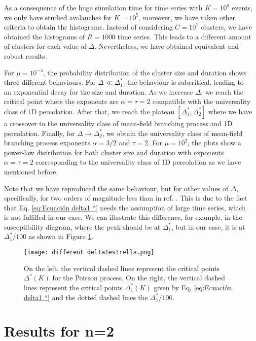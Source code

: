 As a consequence of the huge simulation time for time series with $K=10^8$ events, we only have studied avalanches for $K=10^5$, moreover, we have taken other criteria to obtain the 
histograms. Instead of considering $C=10^7$ clusters, we have obtained the histograms of $R=1000$ time series. This leads to a different amount of clusters for each value of $\Delta$.
Nevertheless, we have obtained equivalent and robust results.

For $\mu=10^{-4}$, the probability distribution of the cluster size and duration shows three different behaviours. For $\Delta\ll\Delta_1^*$, the behaviour is subcritical, leading to
an exponential decay for the size and duration. As we increase $\Delta$, we reach the critical point where the exponents are $\alpha=\tau=2$ compatible with the universality class
of 1D percolation. After that, we reach the plateau $[\Delta_1^*,\Delta_2^*]$ where we have a crossover to the universality class of mean-field branching process and 1D percolation. 
Finally, for $\Delta\to\Delta_2^*$, we obtain the universality class of mean-field branching process exponents $\alpha=3/2$ and $\tau=2$. 
For $\mu=10^2$, the plots show a power-law distribution for both cluster size and duration with exponents $\alpha=\tau=2$ corresponding to the universality class of 1D percolation as we have
mentioned before.

Note that we have reproduced the same behaviour, but for other values of $\Delta$, specifically, for two orders of magnitude less than in ref. \cite{notarmuzi2021percolation}. This is due 
to the fact that Eq. \ref{eq:Ecuación delta1 *} needs the assumption of large time series, which is not fulfilled in our case. 
We can illustrate this difference,
for example, in the susceptibility diagram, where the peak should be at $\Delta_1^*$, but in our case, it is at $\Delta_1^*/100$ as shown in Figure \ref{f:different delta1estrella}. 


\begin{figure}[H]
\centering
\texttt{[image: different delta1estrella.png]}
\caption{On the left, the vertical dashed lines represent the critical points $\Delta^*(K)$ for the Poisson process. On the right, the vertical dashed lines represent 
the critical points $\Delta_1^*(K)$ given by Eq. \ref{eq:Ecuación delta1 *} and the dotted dashed lines the $\Delta_1^*/100$.} 
\label{f:different delta1estrella}
\end{figure}

\section{Results for n=2}

